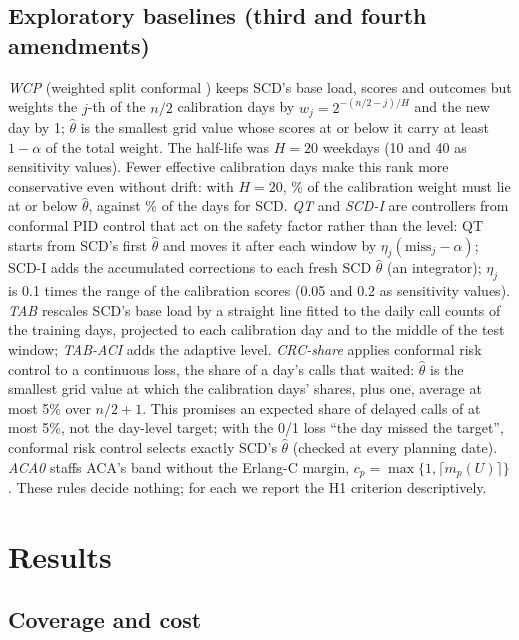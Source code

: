 \documentclass[11pt]{article}
\begin{document}
\subsection{Exploratory baselines (third and fourth amendments)}

\emph{WCP} (weighted split conformal \citep{barber2023beyond}) keeps SCD's base load, scores and outcomes but weights the $j$-th of the $n/2$ calibration days by $w_j=2^{-(n/2-j)/H}$ and the new day by 1; $\hat\theta$ is the smallest grid value whose scores at or below it carry at least $1-\alpha$ of the total weight. The half-life was $H=20$ weekdays (10 and 40 as sensitivity values). Fewer effective calibration days make this rank more conservative even without drift: with $H=20$, \% of the calibration weight must lie at or below $\hat\theta$, against \% of the days for SCD. \emph{QT} and \emph{SCD-I} are controllers from conformal PID control \citep{angelopoulos2023pid} that act on the safety factor rather than the level: QT starts from SCD's first $\hat\theta$ and moves it after each window by $\eta_j(\text{miss}_j-\alpha)$; SCD-I adds the accumulated corrections to each fresh SCD $\hat\theta$ (an integrator); $\eta_j$ is 0.1 times the range of the calibration scores (0.05 and 0.2 as sensitivity values). \emph{TAB} rescales SCD's base load by a straight line fitted to the daily call counts of the training days, projected to each calibration day and to the middle of the test window; \emph{TAB-ACI} adds the adaptive level. \emph{CRC-share} applies conformal risk control \citep{angelopoulos2024conformal} to a continuous loss, the share of a day's calls that waited: $\hat\theta$ is the smallest grid value at which the calibration days' shares, plus one, average at most 5\% over $n/2+1$. This promises an expected share of delayed calls of at most 5\%, not the day-level target; with the 0/1 loss ``the day missed the target'', conformal risk control selects exactly SCD's $\hat\theta$ (checked at every planning date). \emph{ACA0} staffs ACA's band without the Erlang-C margin, $c_p=\max\{1,\lceil m_p(U)\rceil\}$. These rules decide nothing; for each we report the H1 criterion descriptively.

\section{Results}

\subsection{Coverage and cost}
\end{document}
